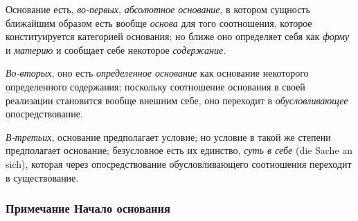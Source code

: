 Основание есть, {\em во-первых},
{\em абсолютное основание}, в котором сущность
ближайшим образом есть вообще {\em основа} для того
соотношения, которое конституируется категорией основания; но ближе оно
определяет себя как {\em форму} и
{\em материю} и сообщает себе некоторое
{\em содержание}.

{\em Во-вторых}, оно есть
{\em определенное основание} как основание некоторого
определенного содержания; поскольку соотношение основания в своей
реализации становится вообще внешним себе, оно переходит в
{\em обусловливающее} опосредствование.

{\em В-третьих}, основание предполагает условие; но
условие в такой же степени предполагает основание; безусловное есть их
единство, {\em суть в себе} (die Sache an sich),
которая через опосредствование обусловливающего соотношения переходит в
существование.


\subsubsection[Примечание Начало основания]{Примечание Начало основания}

